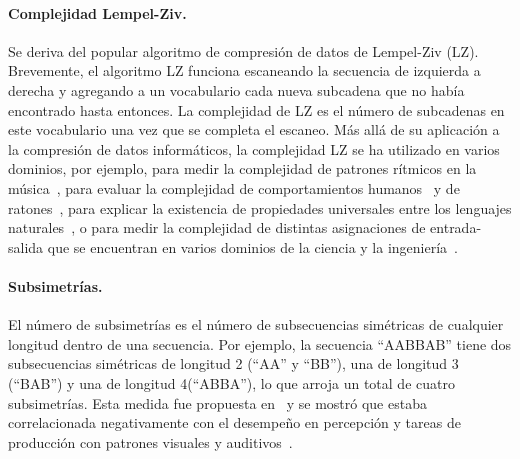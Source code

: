 \paragraph{Complejidad Lempel-Ziv.} Se deriva del popular algoritmo de compresión de datos de Lempel-Ziv (LZ)\cite{f98}. Brevemente, el algoritmo LZ funciona escaneando la secuencia de izquierda a derecha y agregando a un vocabulario cada nueva subcadena que no había encontrado hasta entonces. La complejidad de LZ es el número de subcadenas en este vocabulario una vez que se completa el escaneo. Más allá de su aplicación a la compresión de datos informáticos, la complejidad LZ se ha utilizado en varios dominios, por ejemplo, para medir la complejidad de patrones rítmicos en la música~\cite{f61}, para evaluar la complejidad de comportamientos humanos~\cite{f99} y de ratones~\cite{f100}, para explicar la existencia de propiedades universales entre los lenguajes naturales~\cite{f101}, o para medir la complejidad de distintas asignaciones de entrada-salida que se encuentran en varios dominios de la ciencia y la ingeniería~\cite{f102,f103}.


\paragraph{Subsimetrías.} El número de subsimetrías es el número de subsecuencias simétricas de cualquier longitud dentro de una secuencia. Por ejemplo, la secuencia ``AABBAB'' tiene dos subsecuencias simétricas de longitud 2 (``AA'' y ``BB''), una de longitud 3 (``BAB'') y una de longitud 4(``ABBA''), lo que arroja un total de cuatro subsimetrías. Esta medida fue propuesta en~\cite{f94} y se mostró que estaba correlacionada negativamente con el desempeño en percepción y tareas de producción con patrones visuales y auditivos~\cite{f94,f104}.


